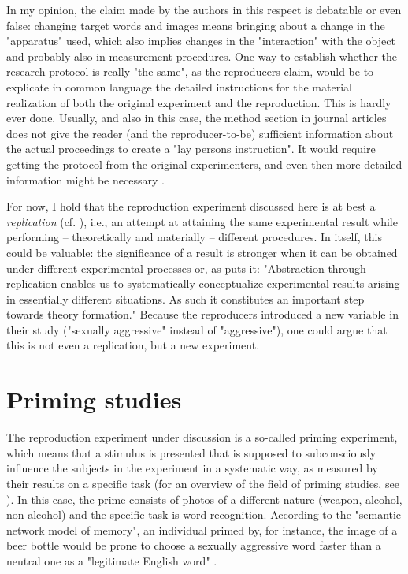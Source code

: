 \documentclass[twocolumn, serif, authordate, reflection]{jote-article}
\begin{document}
In my opinion, the claim made by the authors in this respect is debatable or even false: changing target words and images means bringing about a change in the "apparatus" used, which also implies changes in the "interaction" with the object and probably also in measurement procedures. One way to establish whether the research protocol is really "the same", as the reproducers claim, would be to explicate in common language the detailed instructions for the material realization of both the original experiment and the reproduction. This is hardly ever done. Usually, and also in this case, the method section in journal articles does not give the reader (and the reproducer-to-be) sufficient information about the actual proceedings to create a "lay persons instruction". It would require getting the protocol from the original experimenters, and even then more detailed information might be necessary \parencite{Collins1985}. 

For now, I hold that the reproduction experiment discussed here is at best a \textit{replication }(cf. \cite{Radder1996}), i.e., an attempt at attaining the same experimental result while performing – theoretically and materially – different procedures. In itself, this could be valuable: the significance of a result is stronger when it can be obtained under different experimental processes or, as \textcite[p. 84]{Radder1996} puts it: "Abstraction through replication enables us to systematically conceptualize experimental results arising in essentially different situations. As such it constitutes an important step towards theory formation."  Because the reproducers introduced a new variable in their study ("sexually aggressive" instead of "aggressive"), one could argue that this is not even a replication, but a new experiment. 


{}
\section*{Priming studies}



The reproduction experiment under discussion is a so-called priming experiment, which means that a stimulus is presented that is supposed to subconsciously influence the subjects in the experiment in a systematic way, as measured by their results on a specific task (for an overview of the field of priming studies, see \cite{Derksen2017}). In this case, the prime consists of photos of a different nature (weapon, alcohol, non-alcohol) and the specific task is word recognition. According to the "semantic network model of memory", an individual primed by, for instance, the image of a beer bottle would be prone to choose a sexually aggressive word faster than a neutral one as a "legitimate English word"  \parencite[p. 10]{Leboeuf2020}. 
 
\end{document}
